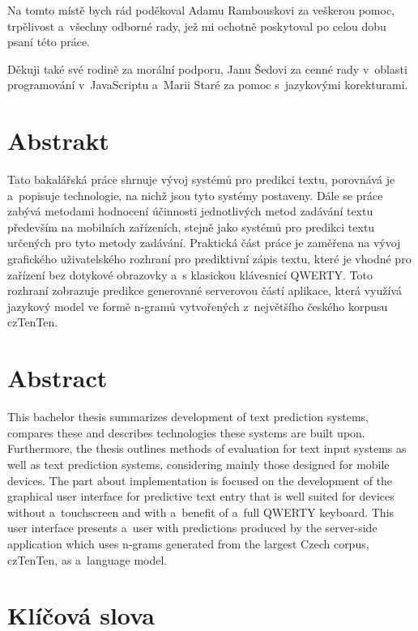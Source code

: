 \documentclass[a4paper,11pt,openany]{book} %
\begin{document}
Na tomto místě bych rád poděkoval Adamu Rambouskovi za veškerou pomoc, trpělivost a~všechny odborné rady, jež mi ochotně poskytoval po celou dobu psaní této práce. 

Děkuji také své rodině za morální podporu, Janu Šedovi za cenné rady v~oblasti programování v~JavaScriptu a~Marii Staré za pomoc s~jazykovými korekturami.

\clearpage

\section*{Abstrakt}

Tato bakalářská práce shrnuje vývoj systémů pro predikci textu, porovnává je a~popisuje technologie, na nichž jsou tyto systémy postaveny. Dále se práce zabývá metodami hodnocení účinnosti jednotlivých metod zadávání textu především na mobilních zařízeních, stejně jako systémů pro predikci textu určených pro tyto metody zadávání. Praktická část práce je zaměřena na vývoj grafického uživatelského rozhraní pro prediktivní zápis textu, které je vhodné pro zařízení bez dotykové obrazovky a~s klasickou klávesnicí QWERTY. Toto rozhraní zobrazuje predikce generované serverovou částí aplikace, která využívá jazykový model ve formě n-gramů vytvořených z~největšího českého korpusu czTenTen.

\section*{Abstract}

This bachelor thesis summarizes development of text prediction systems, compares these and describes technologies these systems are built upon. Furthermore, the thesis outlines methods of evaluation for text input systems as well as text prediction systems, considering mainly those designed for mobile devices. The part about implementation is focused on the development of the graphical user interface for predictive text entry that is well suited for devices without a~touchscreen and with a~benefit of a~full QWERTY keyboard. This user interface presents a~user with predictions produced by the server-side application which uses n-grams generated from the largest Czech corpus, czTenTen, as a~language model.

\section*{Klíčová slova}
\end{document}
